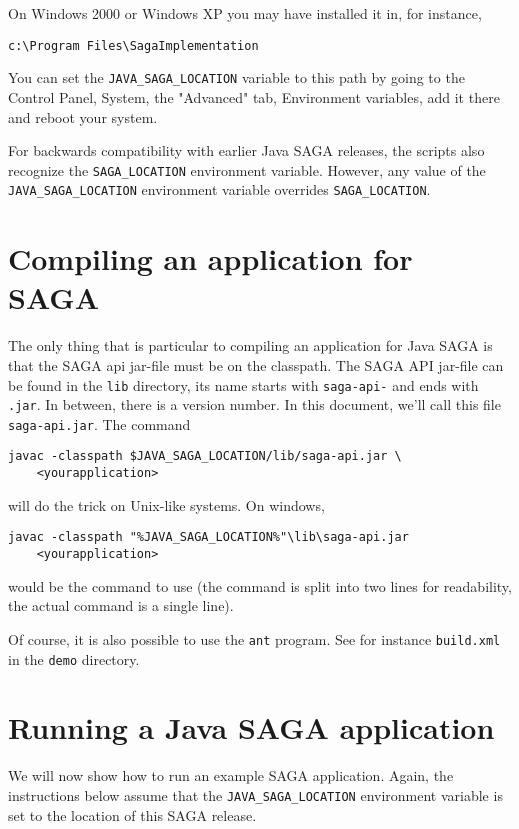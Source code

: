 \documentclass[a4paper,10pt]{article}
\begin{document}
On Windows 2000 or Windows XP you may have installed it in, for instance,
\noindent
{\small
\begin{verbatim}
c:\Program Files\SagaImplementation
\end{verbatim}
}
\noindent
You can set the \texttt{JAVA\_SAGA\_LOCATION} variable to this path by going to the
Control Panel, System, the "Advanced" tab, Environment variables,
add it there and reboot your system.

For backwards compatibility with earlier Java SAGA releases, the scripts
also recognize the \texttt{SAGA\_LOCATION} environment variable.
However, any value of the \texttt{JAVA\_SAGA\_LOCATION} environment variable
overrides \texttt{SAGA\_LOCATION}.

\section{Compiling an application for SAGA}

The only thing that is particular to compiling an application for
Java SAGA is that the SAGA api jar-file must be on the classpath.
The SAGA API jar-file can be found
in the \texttt{lib} directory, its name starts with \texttt{saga-api-} and
ends with \texttt{.jar}. In between, there is a version number. In this
document, we'll call this file \texttt{saga-api.jar}.
The command
\noindent
{\small
\begin{verbatim}
javac -classpath $JAVA_SAGA_LOCATION/lib/saga-api.jar \
    <yourapplication>
\end{verbatim}
}
\noindent
will do the trick on Unix-like systems. On windows,
\noindent
{\small
\begin{verbatim}
javac -classpath "%JAVA_SAGA_LOCATION%"\lib\saga-api.jar
    <yourapplication>
\end{verbatim}
}
\noindent
would be the command to use (the command is split into two lines for
readability, the actual command is a single line).

Of course, it is also possible to use the \texttt{ant} program.
See for instance \texttt{build.xml} in the \texttt{demo} directory.

\section{Running a Java SAGA application}

We will now show how to run an example SAGA application.
Again, the instructions below assume that the 
\texttt{JAVA\_SAGA\_LOCATION}
environment variable is set to the location of this SAGA release.
\end{document}
